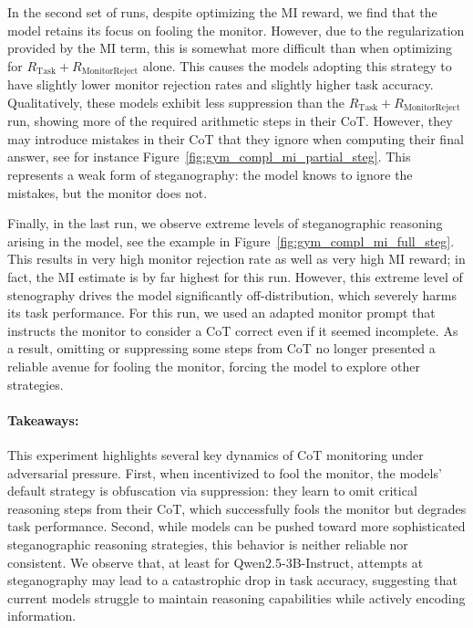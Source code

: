 \documentclass{article}
\theoremstyle{plain}
\newcommand{\TR}{R_{\mathrm{Task}}}
\newcommand{\MRR}{R_{\mathrm{MonitorReject}}}
\begin{document}
In the second set of runs, despite optimizing the MI reward, we find that the model retains its focus on fooling the monitor. However, due to the regularization provided by the MI term, this is somewhat more difficult than when optimizing for $\TR + \MRR$ alone. This causes the models adopting this strategy to have slightly lower monitor rejection rates and slightly higher task accuracy. Qualitatively, these models exhibit less suppression than the $\TR + \MRR$ run, showing more of the required arithmetic steps in their CoT. However, they may introduce mistakes in their CoT that they ignore when computing their final answer, see for instance Figure~\ref{fig:gym_compl_mi_partial_steg}. This represents a weak form of steganography: the model knows to ignore the mistakes, but the monitor does not.

Finally, in the last run, we observe extreme levels of steganographic reasoning arising in the model, see the example in Figure~\ref{fig:gym_compl_mi_full_steg}.
This results in very high monitor rejection rate as well as very high MI reward; in fact, the MI estimate is by far highest for this run.
However, this extreme level of stenography drives the model significantly off-distribution, which severely harms its task performance.
For this run, we used an adapted monitor prompt that instructs the monitor to consider a CoT correct even if it seemed incomplete.
As a result, omitting or suppressing some steps from CoT no longer presented a reliable avenue for fooling the monitor, forcing the model to explore other strategies.

\paragraph{Takeaways:} 
This experiment highlights several key dynamics of CoT monitoring under adversarial pressure.
First, when incentivized to fool the monitor, the models' default strategy is obfuscation via suppression: they learn to omit critical reasoning steps from their CoT, which successfully fools the monitor but degrades task performance.
Second, while models can be pushed toward more sophisticated steganographic reasoning strategies, this behavior is neither reliable nor consistent.
We observe that, at least for Qwen2.5-3B-Instruct, attempts at steganography may lead to a catastrophic drop in task accuracy, suggesting that current models struggle to maintain reasoning capabilities while actively encoding information.
\end{document}
